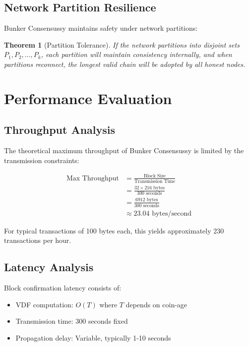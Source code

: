 \documentclass[11pt,a4paper]{article}
\newtheorem{theorem}{Theorem}[section]
\begin{document}
\subsection{Network Partition Resilience}

Bunker Consensussy maintains safety under network partitions:

\begin{theorem}[Partition Tolerance]
If the network partitions into disjoint sets $P_1, P_2, \ldots, P_k$, each partition will maintain consistency internally, and when partitions reconnect, the longest valid chain will be adopted by all honest nodes.
\end{theorem}

\section{Performance Evaluation}

\subsection{Throughput Analysis}

The theoretical maximum throughput of Bunker Consensussy is limited by the transmission constraints:

\begin{align}
\text{Max Throughput} &= \frac{\text{Block Size}}{\text{Transmission Time}}\\
&= \frac{32 \times 216 \text{ bytes}}{300 \text{ seconds}}\\
&= \frac{6912 \text{ bytes}}{300 \text{ seconds}}\\
&\approx 23.04 \text{ bytes/second}
\end{align}

For typical transactions of 100 bytes each, this yields approximately 230 transactions per hour.

\subsection{Latency Analysis}

Block confirmation latency consists of:
\begin{itemize}
\item VDF computation: $O(T)$ where $T$ depends on coin-age
\item Transmission time: 300 seconds fixed
\item Propagation delay: Variable, typically 1-10 seconds
\end{itemize}
\end{document}
